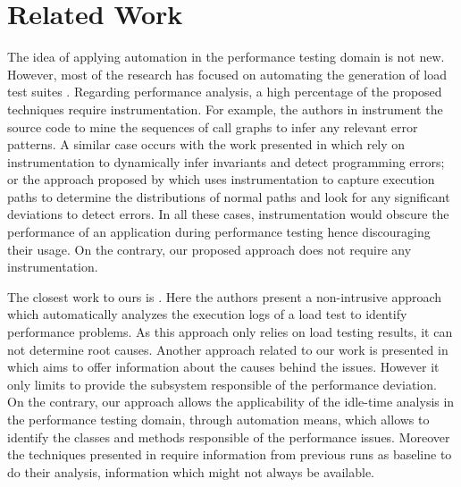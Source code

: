 \documentclass[runningheads,a4paper]{llncs}
\begin{document}
\vspace{-10pt}
\section{Related Work}
\label{RelatedWork}
\vspace{-5pt}
The idea of applying automation in the performance testing domain is not new.
However, most of the research has focused on automating the generation of load
test suites
\cite{Chen1,Elvira1,Zhang1,Briand1,Bayan1,Avritzer2,Avritzer3,Garousi1}.
Regarding performance analysis, a high percentage of the proposed
techniques require instrumentation. For example, the authors in \cite{Yang1}
instrument the source code to mine the sequences of call graphs to infer any
relevant error patterns. A similar case occurs with the work presented in
\cite{Hangal1,Csallner1} which rely on instrumentation to dynamically infer
invariants and detect programming errors; or the approach proposed by
\cite{Chen2} which uses instrumentation to capture execution paths to determine
the distributions of normal paths and look for any significant deviations to
detect errors. In all these cases, instrumentation would obscure the performance
of an application during performance testing hence discouraging their usage.
On the contrary, our proposed approach does not require any instrumentation.

The closest work to ours is \cite{Jiang2009}. Here the authors present a
non-intrusive approach which automatically analyzes the execution logs of a load
test to identify performance problems. As this approach only relies on load
testing results, it can not determine root causes. Another approach related
to our work is presented in \cite{Malik1} which aims to offer information about
the causes behind the issues. However it only limits to provide the subsystem
responsible of the performance deviation. On the contrary, our approach
allows the applicability of the idle-time analysis in the performance testing
domain, through automation means, which allows to identify the classes and
methods responsible of the performance issues. Moreover the techniques presented
in \cite{Jiang2009,Malik1} require information from previous runs as
baseline to do their analysis, information which might not always be available.
\end{document}
